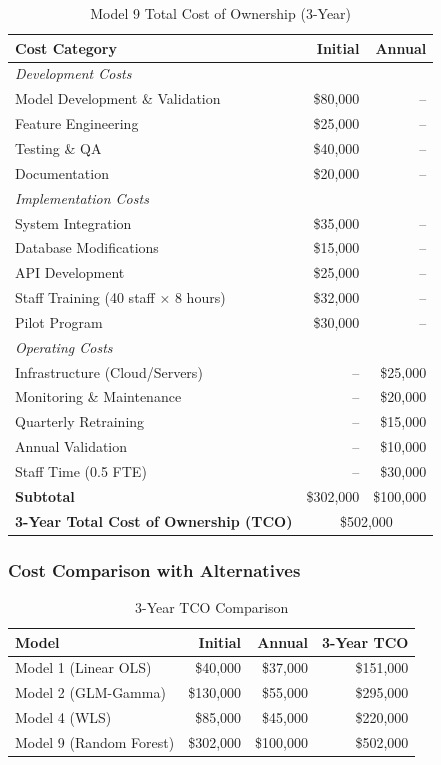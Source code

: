 \begin{table}[h]
\centering
\caption{Model 9 Total Cost of Ownership (3-Year)}
\begin{tabular}{lrr}
\toprule
\textbf{Cost Category} & \textbf{Initial} & \textbf{Annual} \\
\midrule
\multicolumn{3}{l}{\textit{Development Costs}} \\
Model Development \& Validation & \$80,000 & -- \\
Feature Engineering & \$25,000 & -- \\
Testing \& QA & \$40,000 & -- \\
Documentation & \$20,000 & -- \\
\midrule
\multicolumn{3}{l}{\textit{Implementation Costs}} \\
System Integration & \$35,000 & -- \\
Database Modifications & \$15,000 & -- \\
API Development & \$25,000 & -- \\
Staff Training (40 staff × 8 hours) & \$32,000 & -- \\
Pilot Program & \$30,000 & -- \\
\midrule
\multicolumn{3}{l}{\textit{Operating Costs}} \\
Infrastructure (Cloud/Servers) & -- & \$25,000 \\
Monitoring \& Maintenance & -- & \$20,000 \\
Quarterly Retraining & -- & \$15,000 \\
Annual Validation & -- & \$10,000 \\
Staff Time (0.5 FTE) & -- & \$30,000 \\
\midrule
\textbf{Subtotal} & \$302,000 & \$100,000 \\
\textbf{3-Year Total Cost of Ownership (TCO)} & \multicolumn{2}{c}{\$502,000} \\
\bottomrule
\end{tabular}
\label{tab:model9_tco}
\end{table}

\subsubsection{Cost Comparison with Alternatives}

\begin{table}[h]
\centering
\caption{3-Year TCO Comparison}
\begin{tabular}{lrrr}
\toprule
\textbf{Model} & \textbf{Initial} & \textbf{Annual} & \textbf{3-Year TCO} \\
\midrule
Model 1 (Linear OLS) & \$40,000 & \$37,000 & \$151,000 \\
Model 2 (GLM-Gamma) & \$130,000 & \$55,000 & \$295,000 \\
Model 4 (WLS) & \$85,000 & \$45,000 & \$220,000 \\
Model 9 (Random Forest) & \$302,000 & \$100,000 & \$502,000 \\
\bottomrule
\end{tabular}
\end{table}

